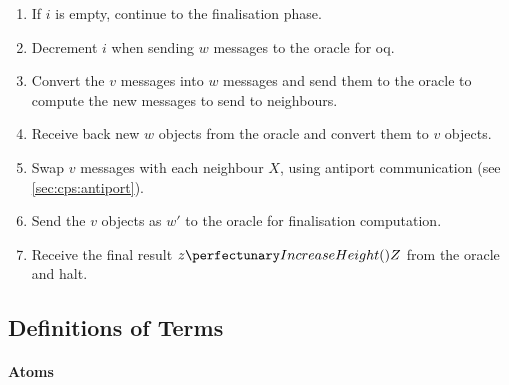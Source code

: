 \begin{enumerate}
    \item If \(i\) is empty, continue to the finalisation phase.
    \item Decrement \(i\) when sending \(w\) messages to the oracle for \gls{oq}.
    \item Convert the \(v\) messages into \(w\) messages and send them to the oracle to compute the new messages to send to neighbours.
    \item Receive back new \(w\) objects from the oracle and convert them to \(v\) objects.
    \item Swap \(v\) messages with each neighbour \(X\), using antiport communication (see \cref{sec:cps:antiport}).
    \item Send the \(v\) objects as \(w'\) to the oracle for finalisation computation.
    \item Receive the final result \(\cpfunc{z}{Z}\) from the oracle and halt.%
\end{enumerate}

\subsection{\label{sec:nmp:globalsync:definitions}Definitions of Terms}

\paragraph{Atoms}
\begin{description}
\end{description}

